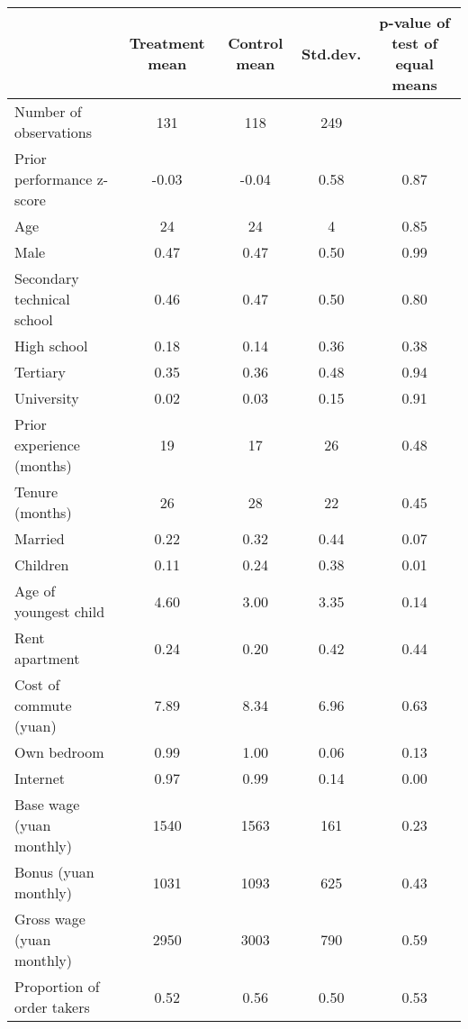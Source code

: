 \begin{tabular}{lcccc} \hline
  & Treatment mean & Control mean & Std.dev. & p-value of test of equal means \\ \hline 
Number of observations & 131 & 118 & 249 &  \\
Prior performance z-score & -0.03 & -0.04 & 0.58 & 0.87 \\
Age & 24 & 24 & 4 & 0.85 \\
Male & 0.47 & 0.47 & 0.50 & 0.99 \\
Secondary technical school & 0.46 & 0.47 & 0.50 & 0.80 \\
High school & 0.18 & 0.14 & 0.36 & 0.38 \\
Tertiary & 0.35 & 0.36 & 0.48 & 0.94 \\
University & 0.02 & 0.03 & 0.15 & 0.91 \\
Prior experience (months) & 19 & 17 & 26 & 0.48 \\
Tenure (months) & 26 & 28 & 22 & 0.45 \\
Married & 0.22 & 0.32 & 0.44 & 0.07 \\
Children & 0.11 & 0.24 & 0.38 & 0.01 \\
Age of youngest child & 4.60 & 3.00 & 3.35 & 0.14 \\
Rent apartment & 0.24 & 0.20 & 0.42 & 0.44 \\
Cost of commute (yuan) & 7.89 & 8.34 & 6.96 & 0.63 \\
Own bedroom & 0.99 & 1.00 & 0.06 & 0.13 \\
Internet & 0.97 & 0.99 & 0.14 & 0.00 \\
Base wage (yuan monthly) & 1540 & 1563 & 161 & 0.23 \\
Bonus (yuan monthly) & 1031 & 1093 & 625 & 0.43 \\
Gross wage (yuan monthly) & 2950 & 3003 & 790 & 0.59 \\
Proportion of order takers & 0.52 & 0.56 & 0.50 & 0.53 \\ \hline
\end{tabular}
